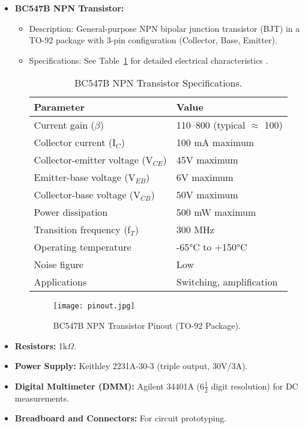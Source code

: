 \documentclass[conference]{IEEEtran}
\begin{document}
\begin{itemize}
    \item \textbf{BC547B NPN Transistor:} 
    \begin{itemize}
        \item Description: General-purpose NPN bipolar junction transistor (BJT) in a TO-92 package with 3-pin configuration (Collector, Base, Emitter).
        \item Specifications: See Table~\ref{tab:bc547_specs} for detailed electrical characteristics \cite{BC547_Datasheet}.
        \begin{table}[h]
            \centering
            \begin{tabular}{ll}
                \toprule
                \textbf{Parameter} & \textbf{Value} \\
                \midrule
                Current gain ($\beta$) & 110–800 (typical $\approx$ 100) \\
                Collector current (I$_C$) & 100 mA maximum \\
                Collector-emitter voltage (V$_{CE}$) & 45V maximum \\
                Emitter-base voltage (V$_{EB}$) & 6V maximum \\
                Collector-base voltage (V$_{CB}$) & 50V maximum \\
                Power dissipation & 500 mW maximum \\
                Transition frequency (f$_T$) & 300 MHz \\
                Operating temperature & -65°C to +150°C \\
                Noise figure & Low \\
                Applications & Switching, amplification \\
                \bottomrule
            \end{tabular}
            \caption{BC547B NPN Transistor Specifications.}
            \label{tab:bc547_specs}
        \end{table}
        \begin{figure}[h]
            \centering
            \texttt{[image: pinout.jpg]} %
            \caption{BC547B NPN Transistor Pinout (TO-92 Package).}
            \label{fig:bc547_pinout}
        \end{figure}
    \end{itemize}

    \item \textbf{Resistors:} 1k$\Omega$.

    \item \textbf{Power Supply:} Keithley 2231A-30-3 (triple output, 30V/3A).

    \item \textbf{Digital Multimeter (DMM):} Agilent 34401A (6$\frac{1}{2}$ digit resolution) for DC measurements.

    \item \textbf{Breadboard and Connectors:} For circuit prototyping.
\end{itemize}
\end{document}
